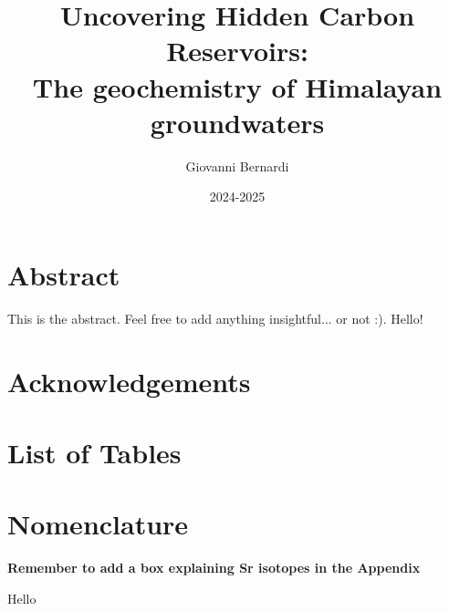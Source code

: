 \documentclass[hidelinks, 12pt]{article} %
\title{
  \vspace{-1cm}
  \textbf{Uncovering Hidden Carbon Reservoirs:\\
  The geochemistry of Himalayan groundwaters}
  \vspace{0.5cm}
}
\author{Giovanni Bernardi}
\date{2024-2025}
\begin{document}

\maketitle





\thispagestyle{empty}

\newpage

\section*{Abstract}
\label{sec:abstract}

This is the abstract. Feel free to add anything insightful... or not :). Hello!



\newpage


\thispagestyle{empty}

\tableofcontents

\newpage

\thispagestyle{empty}

\section*{Acknowledgements}

\newpage

\thispagestyle{empty}

\section*{List of Tables}

\newpage

\thispagestyle{empty}

\section*{Nomenclature}

\newpage




\FloatBarrier
{}





\newpage




\newpage





\newpage





\newpage





\newpage






\textbf{Remember to add a box explaining Sr isotopes in the Appendix}

Hello
\end{document}
